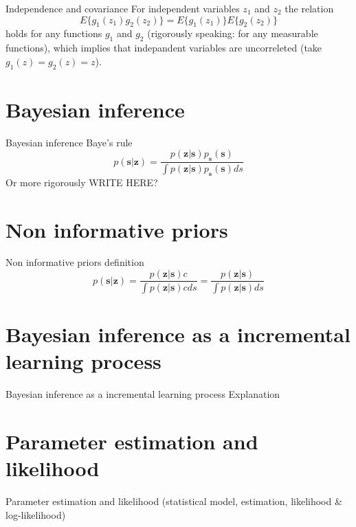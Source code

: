 \documentclass{beamer}
\begin{document}
\begin{frame}{Independence and covariance}
  For independent variables $z_1$ and $z_2$ the relation
  \[
  E\{g_1(z_1)g_2(z_2)\} = E\{g_1(z_1)\}E\{g_2(z_2)\}
  \]
  holds for any functions $g_1$ and $g_2$
  (rigorously speaking: for any measurable functions), which implies that
  indepandent variables are uncorreleted (take $g_1(z) = g_2(z) = z$).
\end{frame}

\section{Bayesian inference}

\begin{frame}{Bayesian inference}
  Baye's rule
  \[
  p(\mathbf{s}|\mathbf{z}) =
  \frac{p(\mathbf{z}|\mathbf{s})p_{\mathbf{s}}(\mathbf{s})}{\int p(\mathbf{z}|\mathbf{s})p_{\mathbf{s}}(\mathbf{s})ds}
  \]
  Or more rigorously WRITE HERE?
\end{frame}

\section{Non informative priors}

\begin{frame}{Non informative priors}
  definition
  \[
  p(\mathbf{s}|\mathbf{z}) =
  \frac{p(\mathbf{z}|\mathbf{s})c}{\int p(\mathbf{z}|\mathbf{s})cds} =
  \frac{p(\mathbf{z}|\mathbf{s})}{\int p(\mathbf{z}|\mathbf{s})ds}
  \]
\end{frame}

\section{Bayesian inference as a incremental learning process}

\begin{frame}{Bayesian inference as a incremental learning process}
  Explanation
\end{frame}

\section{Parameter estimation and likelihood}

\begin{frame}{Parameter estimation and likelihood}
  (statistical model, estimation, likelihood \& log-likelihood)
\end{frame}
\end{document}
